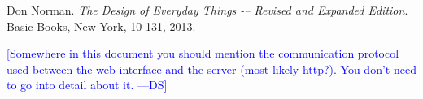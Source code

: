 \documentclass[12pt]{article}
\newcommand{\authornote}[3]{\textcolor{#1}{[#3 ---#2]}}
\newcommand{\authornote}[3]{}
\newcommand{\ds}[1]{\authornote{blue}{DS}{#1}}
\begin{document}
\begin{thebibliography}{9}
Don Norman.
\textit{The Design of Everyday Things -– Revised and Expanded Edition}.
Basic Books, New York, 10-131, 2013.
\end{thebibliography}

\ds{Somewhere in this document you should mention the communication protocol used
between the web interface and the server (most likely http?). You don't need
to go into detail about it.}
\end{document}
